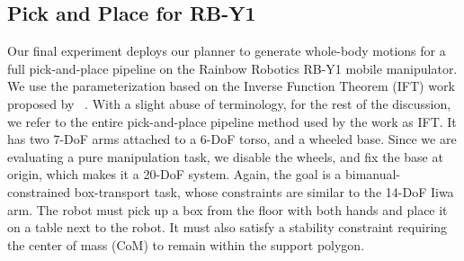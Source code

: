 \documentclass[letterpaper, 10 pt, conference]{ieeeconf}
\begin{document}



\subsection{Pick and Place for RB-Y1}
\label{expts:ruby}
Our final experiment deploys our planner to generate whole-body motions for a full pick-and-place pipeline on the Rainbow Robotics RB-Y1 mobile manipulator. We use the parameterization based on the Inverse Function Theorem (IFT) work proposed by~\cite{cohn2026planning} . With a slight abuse of terminology, for the rest of the discussion, we refer to the entire pick-and-place pipeline method used by the work as IFT. It has two 7-DoF arms attached to a 6-DoF torso, and a wheeled base. Since we are evaluating a pure manipulation task, we disable the wheels, and fix the base at origin, which makes it a 20-DoF system. Again, the goal is a bimanual-constrained box-transport task, whose constraints are similar to the 14-DoF Iiwa arm. The robot must pick up a box from the floor with both hands and place it on a table next to the robot. It must also satisfy a stability constraint requiring the center of mass (CoM) to remain within the support polygon.

\end{document}
